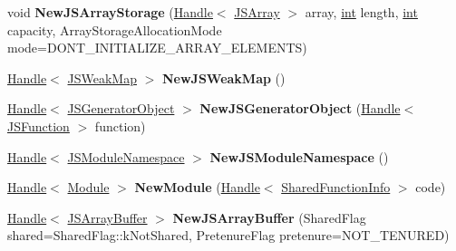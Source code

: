 \begin{DoxyCompactItemize}
void {\bfseries New\+J\+S\+Array\+Storage} (\mbox{\hyperlink{classv8_1_1internal_1_1Handle}{Handle}}$<$ \mbox{\hyperlink{classv8_1_1internal_1_1JSArray}{J\+S\+Array}} $>$ array, \mbox{\hyperlink{classint}{int}} length, \mbox{\hyperlink{classint}{int}} capacity, Array\+Storage\+Allocation\+Mode mode=D\+O\+N\+T\+\_\+\+I\+N\+I\+T\+I\+A\+L\+I\+Z\+E\+\_\+\+A\+R\+R\+A\+Y\+\_\+\+E\+L\+E\+M\+E\+N\+TS)
\item 
\mbox{\label{classv8_1_1internal_1_1Factory_a23a89e88ffc74afa093c7167f1e986a8}} 
\mbox{\hyperlink{classv8_1_1internal_1_1Handle}{Handle}}$<$ \mbox{\hyperlink{classv8_1_1internal_1_1JSWeakMap}{J\+S\+Weak\+Map}} $>$ {\bfseries New\+J\+S\+Weak\+Map} ()
\item 
\mbox{\label{classv8_1_1internal_1_1Factory_a6c52acbd2a618fcf31213df304ab0c03}} 
\mbox{\hyperlink{classv8_1_1internal_1_1Handle}{Handle}}$<$ \mbox{\hyperlink{classv8_1_1internal_1_1JSGeneratorObject}{J\+S\+Generator\+Object}} $>$ {\bfseries New\+J\+S\+Generator\+Object} (\mbox{\hyperlink{classv8_1_1internal_1_1Handle}{Handle}}$<$ \mbox{\hyperlink{classv8_1_1internal_1_1JSFunction}{J\+S\+Function}} $>$ function)
\item 
\mbox{\label{classv8_1_1internal_1_1Factory_afcf7d75db2321fc449991ef0db6adf72}} 
\mbox{\hyperlink{classv8_1_1internal_1_1Handle}{Handle}}$<$ \mbox{\hyperlink{classv8_1_1internal_1_1JSModuleNamespace}{J\+S\+Module\+Namespace}} $>$ {\bfseries New\+J\+S\+Module\+Namespace} ()
\item 
\mbox{\label{classv8_1_1internal_1_1Factory_a5f3b24b38a9ea4ba10a3ea518b8ff405}} 
\mbox{\hyperlink{classv8_1_1internal_1_1Handle}{Handle}}$<$ \mbox{\hyperlink{classv8_1_1internal_1_1Module}{Module}} $>$ {\bfseries New\+Module} (\mbox{\hyperlink{classv8_1_1internal_1_1Handle}{Handle}}$<$ \mbox{\hyperlink{classv8_1_1internal_1_1SharedFunctionInfo}{Shared\+Function\+Info}} $>$ code)
\item 
\mbox{\label{classv8_1_1internal_1_1Factory_ac88b520d080bf58cce044706f95821ad}} 
\mbox{\hyperlink{classv8_1_1internal_1_1Handle}{Handle}}$<$ \mbox{\hyperlink{classv8_1_1internal_1_1JSArrayBuffer}{J\+S\+Array\+Buffer}} $>$ {\bfseries New\+J\+S\+Array\+Buffer} (Shared\+Flag shared=Shared\+Flag\+::k\+Not\+Shared, Pretenure\+Flag pretenure=N\+O\+T\+\_\+\+T\+E\+N\+U\+R\+ED)

\end{DoxyCompactItemize}
